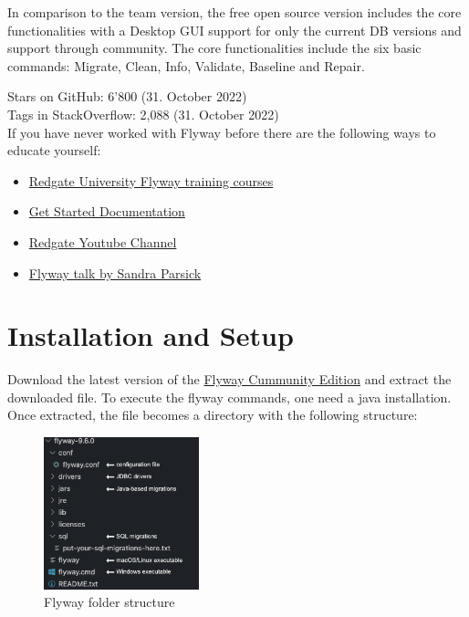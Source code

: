 In comparison to the team version, the free open source version includes the core functionalities with a Desktop GUI support for only the current DB versions and support through community. The core functionalities include the six basic commands: Migrate, Clean, Info, Validate, Baseline and Repair.

%
Stars on GitHub: 6'800 (31. October 2022)\\
Tags in StackOverflow: 2,088 (31. October 2022)\\

%
If you have never worked with Flyway before there are the following ways to educate yourself:
\begin{itemize}
	\item \href{https://www.red-gate.com/hub/university/courses/flyway}{Redgate University Flyway training courses}
	\item \href{https://flywaydb.org/documentation}{Get Started Documentation}
	\item \href{https://www.youtube.com/playlist?list=PLhFdCK734P8DYHYYWaJpzJJ-qZFZ_JTHM}{Redgate Youtube Channel}
	\item \href{https://www.youtube.com/watch?v=dzRzlDpdDW4}{Flyway talk by Sandra Parsick}
\end{itemize}

\section{Installation and Setup}
Download the latest version of the \href{https://flywaydb.org/download/community}{Flyway Cummunity Edition} and extract the downloaded file. To execute the flyway commands, one need a java installation.
Once extracted, the file becomes a directory with the following structure:

\begin{figure}[H]
    \centering
    \includegraphics[width=0.4\textwidth]{./chapters/intro_flyway/images/flyway_folder_structure}
   \caption[Flyway folder structure - Source: Own illustration]{Flyway folder structure}
    \label{fig:flyway_folder_structure}
\end{figure}


